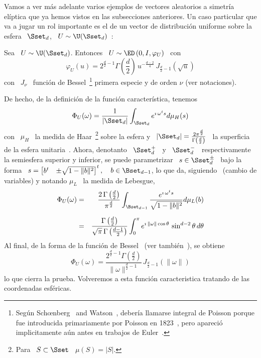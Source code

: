 Vamos a ver  m\'as adelante varios ejemplos de  vectores aleatorios a simetr\'ia
el\'iptica  que  ya  hemos  vistos  en las  subsecciones  anteriores.   Un  caso
particular que va a jugar un rol importante es el de un vector de distribuci\'on
uniforme sobre la esfera \ $\Sset_d$, \ $U \sim \U(\Sset_d)$~\cite{FanKot90}:
%
\begin{ejemplo}
\label{Ej:MP:GeneCaracUniformeEsfera}
%
  Sea \  $U \sim \U(\Sset_d)$. Entonces  \ $U \sim  \ED\left( 0 , I  , \varphi_U
  \right)$ \ con
  \[
  \varphi_U(u)   =  2^{\frac{d}{2}-1}   \Gamma\left(   \frac{d}{2}  \right)   \,
  u^{-\frac{d-2}{4}} \, J_{\frac{d}{2}-1}\left( \sqrt{u} \right)
  \]
  con \ $J_\nu$ \ funci\'on de Bessel~\footnote{Seg\'un Sch{\oe}nberg~\cite[Nota
    de  pie~9]{Sch38} and Watson~\cite[p.~24,  nota de  pie~*]{Wat22}, deber\'ia
    llamarse  integral  de  Poisson  porque fue  introducida  primariamente  por
    Poisson en 1823~\cite{Poi23}, pero  apareci\'o implicitamente a\'un antes en
    trabajos  de Euler~\cite[Cap.~X, \S~1036]{Eul1769}.}   primera especie  y de
  orden $\nu$ (ver notaciones).
  
  De hecho, de la definici\'on de la funci\'on caracter\'istica, tenemos
  \[
  \Phi_U(\omega) =  \frac{1}{|\Sset_d|} \int_{\Sset_d} e^{\imath  \, \omega^t s}
  d\mu_H(s)
  \]
  con \ $\mu_H$ \ la medida de Haar~\footnote{Para \ $S \subset \Sset$ \ $\mu(S)
    =    |S|$.}     sobre    la    esfera    y   \    $|\Sset_d|    =    \frac{2
    \pi^{\frac{d}{2}}}{\Gamma\left( \frac{d}{2} \right)}$  \ la superficia de la
  esfera  unitaria~\cite{GraRyz15}.   Ahora,  denotanto  \  $\Sset_d^+$  \  y  \
  $\Sset_d^-$  \ respectivamente  la semiesfera  superior y  inferior,  se puede
  parametrizar \  $s \in \Sset_d^{\pm}$ \  bajo la forma \  $s = \begin{bmatrix}
    b^t & \pm \sqrt{1-\|b\|^2} \end{bmatrix}^t, \quad b \in \Bset_{d-1}$, lo que
  da,  siguiendo~\cite[ec.~4.644]{GraRyz15}  (cambio  de  variables)  y  notando
  $\mu_L$ \ la medida de Lebesgue,
  \begin{eqnarray*}
  \Phi_U(\omega) & = & \frac{2 \, \Gamma\left( \frac{d}{2}
  \right)}{\pi^{\frac{d}{2}}} \int_{\Bset_{d-1}} \frac{e^{\imath \, \omega^t
  s}}{\sqrt{1-\|b\|^2}} d\mu_L(b)\\[2mm]
  & = & \frac{\Gamma\left( \frac{d}{2} \right)}{\sqrt{\pi} \, \Gamma\left(
  \frac{d-1}{2} \right)} \int_0^{\pi} e^{\imath \, \| \omega \| \cos\theta} \,
  \sin^{d-2}\theta \, d\theta
  \end{eqnarray*}
  Al final,  de la forma de la  funci\'on de Bessel~\cite[Ec.~8.411-7]{GraRyz15}
  (ver tambi\'en~\cite{AbrSte70, Wat22, GraMat95}), se obtiene
  \[
  \Phi_U(\omega) =  \frac{2^{\frac{d}{2}-1} \Gamma\left( \frac{d}{2} \right)}{\|
    \omega \|^{\frac{d}{2}-1}} \, J_{\frac{d}{2}-1}\left( \|\omega\| \right)
  \]
  lo que cierra  la prueba. Volveremos a esta  funci\'on caracteristica tratando
  de las coordenadas esf\'ericas.
\end{ejemplo}

